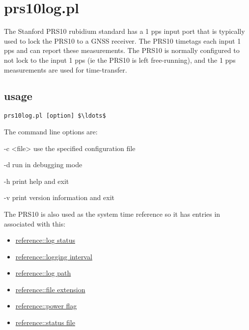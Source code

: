 \section{prs10log.pl}

\hypertarget{h:prs10log}{}

The Stanford PRS10 rubidium standard has a 1 pps input port that is typically used
to lock the PRS10 to a GNSS receiver. The PRS10 timetags each input 1 pps and can report
these measurements. The PRS10 is normally configured to not lock to the input 1 pps 
(ie the PRS10 is left free-running),
and the 1 pps measurements are used for time-transfer.

\subsection{usage}

\begin{lstlisting}[mathescape=true]
prs10log.pl [option] $\ldots$ 
\end{lstlisting}

The command line options are:
\begin{description*}
	\item[-c \textless file\textgreater] use the specified configuration file
	\item[-d]	run in debugging mode
	\item[-h]	print help and exit
	\item[-v]	print version information and exit
\end{description*}

The PRS10 is also used as the system time reference so it has
entries in  associated with this:
\begin{itemize}
	\item \hyperlink{h:reference_log_status}{reference::log status}
	\item \hyperlink{h:reference_logging_interval}{reference::logging interval}
	\item \hyperlink{h:reference_log_path}{reference::log path}
	\item \hyperlink{h:reference_file_extension}{reference::file extension}
	\item \hyperlink{h:reference_power_flag}{reference::power flag}
	\item \hyperlink{h:reference_status_file}{reference::status file}
\end{itemize}
